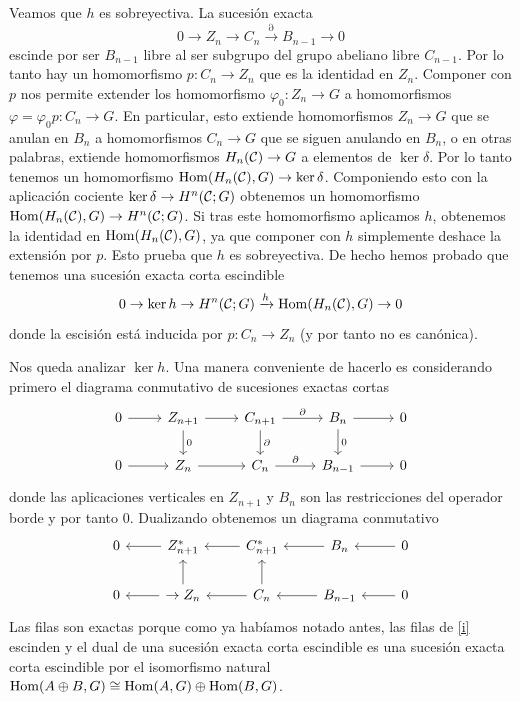 \documentclass[TA.tex]{subfiles}
\begin{document}
Veamos que $h$ es sobreyectiva. La sucesión exacta 
\[0\to Z_n\to C_n\xrightarrow{\partial}B_{n-1}\to 0\]
escinde por ser $B_{n-1}$ libre al ser subgrupo del grupo abeliano libre $C_{n-1}$. Por lo tanto hay un homomorfismo $p:C_n\to Z_n$ que es la identidad en $Z_n$. Componer con $p$ nos permite extender los homomorfismo $\varphi_0:Z_n\to G$ a homomorfismos $\varphi=\varphi_0p:C_n\to G$. En particular, esto extiende homomorfismos $Z_n\to G$ que se anulan en $B_n$ a homomorfismos $C_n\to G$ que se siguen anulando en $B_n$, o en otras palabras, extiende homomorfismos $H_n(\mathcal{C})\to G$ a elementos de $\ker\delta$. Por lo tanto tenemos un homomorfismo $\operatorname{Hom}(H_n(\mathcal{C}),G)\to\ker\delta$. Componiendo esto con la aplicación cociente $\ker\delta\to H^n(\mathcal{C};G)$ obtenemos un homomorfismo $\operatorname{Hom}(H_n(\mathcal{C}),G)\to H^n(\mathcal{C};G)$. Si tras este homomorfismo aplicamos $h$, obtenemos la identidad en $\operatorname{Hom}(H_n(\mathcal{C}),G)$, ya que componer con $h$ simplemente deshace la extensión por $p$. Esto prueba que $h$ es sobreyectiva. De hecho hemos probado que tenemos una sucesión exacta corta escindible
\[
0\to\ker h\to H^n(\mathcal{C};G)\xrightarrow{h}\operatorname{Hom}(H_n(\mathcal{C}),G)\to 0
\] 
donde la escisión está inducida por $p:C_n\to Z_n$ (y por tanto no es canónica). 

Nos queda analizar $\ker h$. Una manera conveniente de hacerlo es considerando primero el diagrama conmutativo de sucesiones exactas cortas
\begin{equation}\label{i}
\begin{tikzcd}
0\arrow[r]& Z_{n+1}\arrow[r]\arrow[d, "0"] & C_{n+1}\arrow[d, "\partial"]\arrow[r, "\partial"] & B_n\arrow[d, "0"]\arrow[r]& 0\\
0\arrow[r]& Z_{n}\arrow[r] & C_{n}\arrow[r, "\partial"] & B_{n-1}\arrow[r]& 0
\end{tikzcd}
\end{equation}
donde las aplicaciones verticales en $Z_{n+1}$ y $B_n$ son las restricciones del operador borde y por tanto 0. Dualizando obtenemos un diagrama conmutativo 
\begin{equation}\label{ii}
\begin{tikzcd}
0& Z_{n+1}^*\arrow[l] & C_{n+1}^*\arrow[l] & B_n\arrow[l]& 0\arrow[l]\\
0&\to Z_{n}\arrow[l]\arrow[u] & C_{n}\arrow[l]\arrow[u] & \arrow[l]B_{n-1}&\arrow[l] 0
\end{tikzcd}
\end{equation}
Las filas son exactas porque como ya habíamos notado antes, las filas de \ref{i} escinden y el dual de una sucesión exacta corta escindible es una sucesión exacta corta escindible por el isomorfismo natural $\operatorname{Hom}(A\oplus B,G)\cong\operatorname{Hom}(A,G)\oplus\operatorname{Hom}(B,G)$. 
\end{document}

